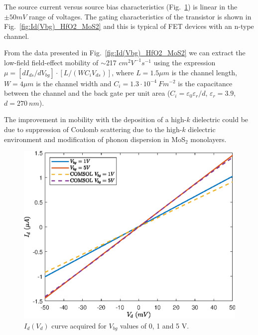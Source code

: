 \documentclass[12pt,a4paper,titlepage]{article}
\begin{document}
The source current versus source bias characteristics (Fig.~\ref{fig:Id(Vd)_HfO2_MoS2}) is linear in the $\pm 50 mV$ range of voltages. The gating characteristics of the transistor is shown in Fig.~\ref{fig:Id(Vbg)_HfO2_MoS2} and this is typical of FET devices with an n-type channel.

From the data presented in Fig.~\ref{fig:Id(Vbg)_HfO2_MoS2} we can extract the low-field field-effect mobility of $\sim$217 $cm^2 V^{-1} s^{-1}$ using the expression $\mu = [dI_{ds}/dV_{bg}]\cdot[L/(WC_iV_{ds})]$, where $L = 1.5 \mu m$ is the channel length, $W = 4 \mu m$ is the channel width and $C_i = 1.3 \cdot 10^{-4}~Fm^{-2}$ is the capacitance between the channel and the back gate per unit area ($C_i = \varepsilon_0 \varepsilon_r / d$, $\varepsilon_r = 3.9$, $d = 270~nm$).

The improvement in mobility with the deposition of a high-$k$ dielectric could be due to suppression of Coulomb scattering due to the high-$k$ dielectric environment and modification of phonon dispersion in MoS$_2$ monolayers.

\begin{figure}[H]
	\centering
	\includegraphics[width=.75\textwidth]{Grafici/Id(Vd)_HfO2_MoS2.eps} 
	\caption{$I_d(V_d)$ curve acquired for $V_{bg}$ values of 0, 1 and 5 V.}
	\label{fig:Id(Vd)_HfO2_MoS2}
\end{figure}
\end{document}
